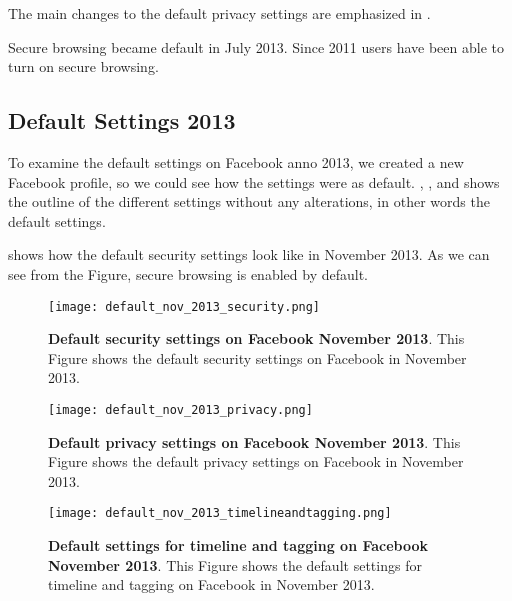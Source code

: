 
The main changes to the default privacy settings are emphasized in . 

Secure browsing became default in July 2013. Since 2011 users have been able to turn on secure browsing.  \cite{secureBrowsing}

\subsection{Default Settings 2013}

To examine the default settings on Facebook anno 2013, we created a new Facebook profile, so we could see how the settings were as default. , ,  and  shows the outline of the different settings without any alterations, in other words the default settings. 

 shows how the default security settings look like in November 2013. As we can see from the Figure, secure browsing is enabled by default. 

\begin{figure}[h!]
\centering
\texttt{[image: default\_nov\_2013\_security.png]}
\caption[Default security settings on Facebook November 2013]{\textbf{Default security settings on Facebook November 2013}. This Figure shows the default security settings on Facebook in November 2013.} 
\label{fig:security2013}
\end{figure}

\begin{figure}[h!]
\centering
\texttt{[image: default\_nov\_2013\_privacy.png]}
\caption[Default privacy settings on Facebook November 2013]{\textbf{Default privacy settings on Facebook November 2013}. This Figure shows the default privacy settings on Facebook in November 2013.} 
\label{fig:privacy2013}
\end{figure}

\begin{figure}[h!]
\centering
\texttt{[image: default\_nov\_2013\_timelineandtagging.png]}
\caption[Default settings for timeline and tagging on Facebook November 2013]{\textbf{Default settings for timeline and tagging on Facebook November 2013}. This Figure shows the default settings for timeline and tagging on Facebook in November 2013.} 
\label{fig:timelineandtagging2013}
\end{figure}

